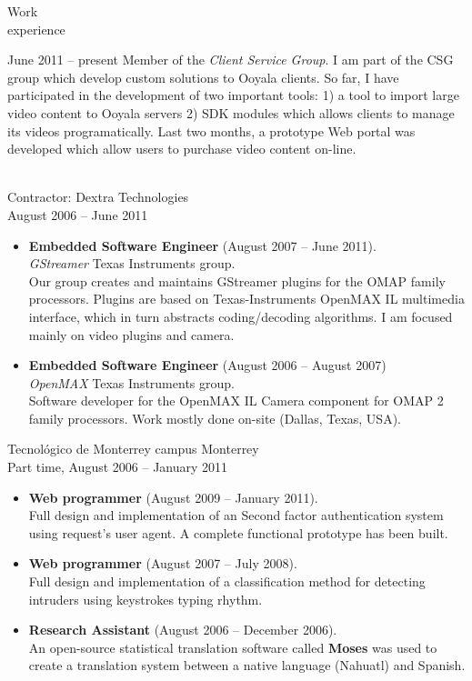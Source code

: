 \documentclass{resume}
\def\itesm{Tecnol\'ogico de Monterrey campus Monterrey}
\begin{document}
\begin{category}{Work \\experience}

June 2011 -- present
Member of the \textit{Client Service Group}.
I am part of the CSG group which develop custom solutions to Ooyala clients. So far, I have participated in the development of
two important tools: 1) a tool to import large video content to Ooyala servers 2) SDK modules which allows clients to manage its videos
programatically. Last two months, a prototype Web portal was developed which allow users to purchase video content on-line. 

\\
Contractor: Dextra Technologies\\
August 2006 -- June 2011
\begin{itemize}
\item \textbf{Embedded Software Engineer} (August 2007 -- June 2011).\\
\textit{GStreamer} Texas Instruments group.\\
Our group creates and maintains GStreamer plugins for the OMAP family processors. Plugins are based on Texas-Instruments OpenMAX IL multimedia interface,
which in turn abstracts coding/decoding algorithms. I am focused mainly on video plugins and camera.\\
\item \textbf{Embedded Software Engineer} (August 2006 -- August 2007)\\
\textit{OpenMAX} Texas Instruments group.\\
Software developer for the OpenMAX IL Camera component for OMAP 2 family processors. Work mostly done on-site (Dallas, Texas, USA).\\
\end{itemize}

\citem\itesm\\
Part time, August 2006 -- January 2011
\begin{itemize}
\item \textbf{Web programmer} (August 2009 -- January 2011).\\
Full design and implementation of an Second factor authentication system using request's user agent. A complete functional prototype has been built.
\item \textbf{Web programmer} (August 2007 -- July 2008).\\	
Full design and implementation of a classification method for detecting intruders using keystrokes typing rhythm. 
\item \textbf{Research Assistant} (August 2006 -- December 2006).\\
An open-source statistical translation software called \textbf{Moses} was used to create a translation system	between a native language (Nahuatl) and Spanish.\\
\\
\end{itemize}
\end{category}
\end{document}

